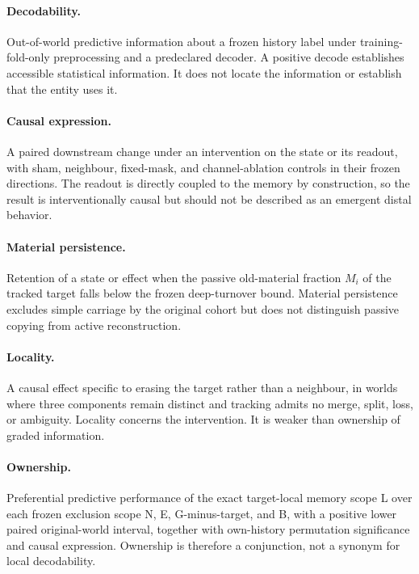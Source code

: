\documentclass[11pt]{article}
\begin{document}
\paragraph{Decodability.}
Out-of-world predictive information about a frozen history label under training-fold-only preprocessing and a predeclared decoder. A positive decode establishes accessible statistical information. It does not locate the information or establish that the entity uses it.

\paragraph{Causal expression.}
A paired downstream change under an intervention on the state or its readout, with sham, neighbour, fixed-mask, and channel-ablation controls in their frozen directions. The readout is directly coupled to the memory by construction, so the result is interventionally causal but should not be described as an emergent distal behavior.

\paragraph{Material persistence.}
Retention of a state or effect when the passive old-material fraction $M_i$ of the tracked target falls below the frozen deep-turnover bound. Material persistence excludes simple carriage by the original cohort but does not distinguish passive copying from active reconstruction.

\paragraph{Locality.}
A causal effect specific to erasing the target rather than a neighbour, in worlds where three components remain distinct and tracking admits no merge, split, loss, or ambiguity. Locality concerns the intervention. It is weaker than ownership of graded information.

\paragraph{Ownership.}
Preferential predictive performance of the exact target-local memory scope L over each frozen exclusion scope N, E, G-minus-target, and B, with a positive lower paired original-world interval, together with own-history permutation significance and causal expression. Ownership is therefore a conjunction, not a synonym for local decodability.
\end{document}
